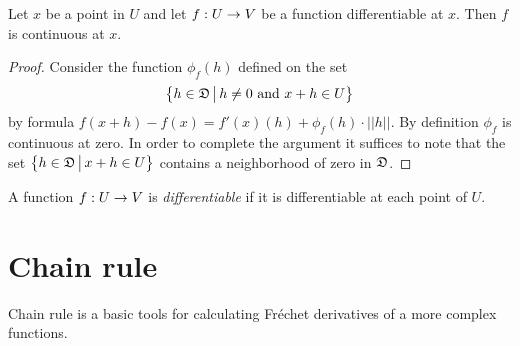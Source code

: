\begin{fact}\label{fact:differentiable_is_continuous}
Let $x$ be a point in $U$ and let $f:U\rightarrow V$ be a function differentiable at $x$. Then $f$ is continuous at $x$.
\end{fact}
\begin{proof}
Consider the function $\phi_f(h)$ defined on the set 
$$\big\{h\in {\mathfrak D}\,\big|\,h\neq 0\mbox{ and }x+h\in U\big\}$$
by formula $f(x+h) - f(x) = f'(x)(h) + \phi_f(h)\cdot ||h||$. By definition $\phi_f$ is continuous at zero. In order to complete the argument it suffices to note that the set $\big\{h\in {\mathfrak D}\,\big|\,x+h\in U\big\}$ contains a neighborhood of zero in ${\mathfrak D}$.
\end{proof}

\begin{definition}
A function $f:U\rightarrow V$ is \textit{differentiable} if it is differentiable at each point of $U$.
\end{definition}

\section{Chain rule}
\noindent
Chain rule is a basic tools for calculating Fr{\'e}chet derivatives of a more complex functions.

